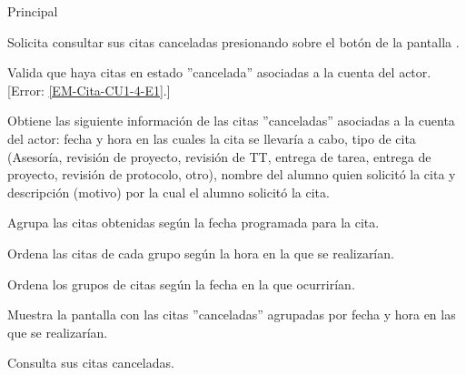 \begin{UCtrayectoria}{Principal}

	\UCpaso [\UCactor] Solicita consultar sus citas canceladas presionando sobre el botón  de la pantalla .

	\UCpaso Valida que haya citas en estado ''cancelada'' asociadas a la cuenta del actor. [Error: \ref{EM-Cita-CU1-4-E1}.]

	\UCpaso Obtiene las siguiente información de las citas ''canceladas'' asociadas a la cuenta del actor: fecha y hora en las cuales la cita se llevaría a cabo, tipo de cita (Asesoría, revisión de proyecto, revisión de TT, entrega de tarea, entrega de proyecto, revisión de protocolo, otro), nombre del alumno quien solicitó la cita y descripción (motivo) por la cual el alumno solicitó la cita.

	\UCpaso Agrupa las citas obtenidas según la fecha programada para la cita.

	\UCpaso Ordena las citas de cada grupo según la hora en la que se realizarían. 

	\UCpaso Ordena los grupos de citas según la fecha en la que ocurrirían.

	\UCpaso Muestra la pantalla  con las citas ''canceladas'' agrupadas por fecha y hora en las que se realizarían. 

	\UCpaso [\UCactor] Consulta sus citas canceladas. 

\end{UCtrayectoria}
